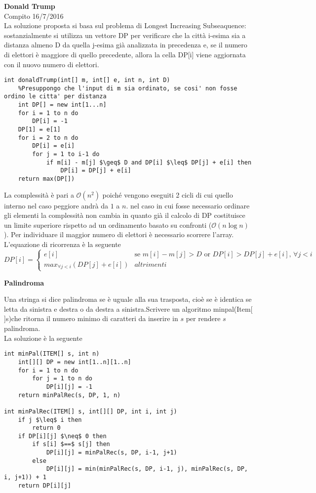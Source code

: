 \documentclass[../cheatSheetAlgoritmi.tex]{subfiles}
\begin{document}
\bigskip
\textbf{Donald Trump}\\
Compito 16/7/2016\\
La soluzione proposta si basa sul problema di Longest Increasing Subseaquence: sostanzialmente si utilizza un vettore DP per verificare che la città i-esima sia a distanza almeno D da quella j-esima già analizzata in precedenza e, se il numero di elettori è maggiore di quello precedente, allora la cella DP[i] viene aggiornata con il nuovo numero di elettori.
\begin{lstlisting}[caption=Donald Trump]
int donaldTrump(int[] m, int[] e, int n, int D)
	%Presuppongo che l'input di m sia ordinato, se cosi' non fosse ordino le citta' per distanza
	int DP[] = new int[1...n]
	for i = 1 to n do
		DP[i] = -1
	DP[1] = e[1]
	for i = 2 to n do
		DP[i] = e[i]
		for j = 1 to i-1 do
			if m[i] - m[j] $\geq$ D and DP[i] $\leq$ DP[j] + e[i] then
				DP[i] = DP[j] + e[i]
	return max(DP[])
\end{lstlisting}
La complessità è pari a $\mathcal{O}(n^{2})$ poiché vengono eseguiti 2 cicli di cui quello interno nel caso peggiore andrà da $1$ a $n$. nel caso in cui fosse necessario ordinare gli elementi la complessità non cambia in quanto già il calcolo di DP costituisce un limite superiore rispetto ad un ordinamento basato su confronti ($\mathcal{O}(n\log{n})$). Per individuare il maggior numero di elettori è necessario scorrere l'array.\\
L'equazione di ricorrenza è la seguente
\begin{equation*}
  	DP[i] =\begin{cases}
    	e[i] & \text{se $m[i] - m[j] > D$ or $DP[i] > DP[j] + e[i]$, $\forall j < i$ }\\
    	max_{\forall j < i} (DP[j] + e[i]) & \text{$altrimenti$}
  	\end{cases}
\end{equation*}
\newpage
\begin{flushleft}
\textbf{Palindroma}
\end{flushleft}
Una stringa si dice palindroma se è uguale alla sua trasposta, cioè se è identica se letta da sinistra e destra o da destra a sinistra.Scrivere un algoritmo minpal(Item[ ]s)che ritorna il numero minimo di caratteri da inserire in $s$ per rendere $s$ palindroma.\\
La soluzione è la seguente
\begin{lstlisting}[caption=Palindroma]
int minPal(ITEM[] s, int n)
	int[][] DP = new int[1..n][1..n]
    for i = 1 to n do
    	for j = 1 to n do
      		DP[i][j] = -1
    return minPalRec(s, DP, 1, n)

int minPalRec(ITEM[] s, int[][] DP, int i, int j)
	if j $\leq$ i then
		return 0
	if DP[i][j] $\neq$ 0 then
		if s[i] $==$ s[j] then
			DP[i][j] = minPalRec(s, DP, i-1, j+1)
		else
			DP[i][j] = min(minPalRec(s, DP, i-1, j), minPalRec(s, DP, i, j+1)) + 1
	return DP[i][j]	
\end{lstlisting}
\end{document}

